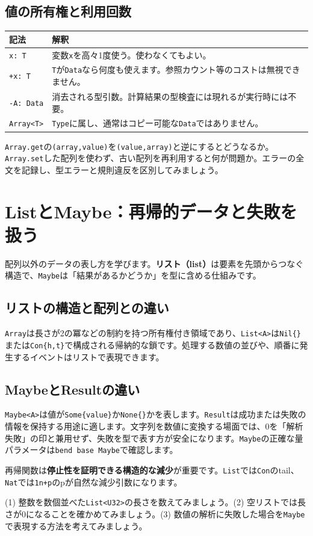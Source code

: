 \documentclass[11pt,a4paper,openany]{book}
\newcommand{\code}[1]{\texttt{#1}}
\newcommand{\term}[1]{\textbf{#1}}
\newcommand{\readcode}[2]{}
\newcommand{\exercise}[1]{\begin{exercisebox}#1\end{exercisebox}}
\begin{document}
\section{値の所有権と利用回数}
\begin{tabularx}{\linewidth}{@{}p{28mm}X@{}}
\toprule
記法 & 解釈\\
\midrule
\code{x: T} & 変数\code{x}を高々1度使う。使わなくてもよい。\\
\code{+x: T} & \code{T}が\code{Data}なら何度も使えます。参照カウント等のコストは無視できません。\\
\code{-A: Data} & 消去される型引数。計算結果の型検査には現れるが実行時には不要。\\
\code{Array<T>} & \code{Type}に属し、通常はコピー可能な\code{Data}ではありません。\\
\bottomrule
\end{tabularx}
\exercise{\code{Array.get}の\code{(array,value)}を\code{(value,array)}と逆にするとどうなるか。\code{Array.set}した配列を使わず、古い配列を再利用すると何が問題か。エラーの全文を記録し、型エラーと規則違反を区別してみましょう。}


\chapter{ListとMaybe：再帰的データと失敗を扱う}
\begin{tcolorbox}[colback=blue!3,colframe=blue!16,boxrule=.35pt,arc=1mm,left=3mm,right=3mm,top=2mm,bottom=2mm]
\small 配列以外のデータの表し方を学びます。\term{リスト（list）}は要素を先頭からつなぐ構造で、\code{Maybe}は「結果があるかどうか」を型に含める仕組みです。
\end{tcolorbox}

\section{リストの構造と配列との違い}
\code{Array}は長さが2の冪などの制約を持つ所有権付き領域であり、\code{List<A>}は\code{Nil\{\}}または\code{Con\{h,t\}}で構成される帰納的な鎖です。処理する数値の並びや、順番に発生するイベントはリストで表現できます。
\readcode{14_list_basics.bend}{リストを構造再帰で処理する（14\_list\_basics.bend）}
\section{MaybeとResultの違い}
\code{Maybe<A>}は値が\code{Some\{value\}}か\code{None\{\}}かを表します。\code{Result}は成功または失敗の情報を保持する用途に適します。文字列を数値に変換する場面では、0を「解析失敗」の印と兼用せず、失敗を型で表す方が安全になります。\code{Maybe}の正確な量パラメータは\code{bend base Maybe}で確認します。
\begin{pointbox}
再帰関数は\term{停止性を証明できる構造的な減少}が重要です。\code{List}では\code{Con}のtail、\code{Nat}では\code{1n+p}のpが自然な減少引数になります。
\end{pointbox}
\exercise{(1) 整数を数個並べた\code{List<U32>}の長さを数えてみましょう。(2) 空リストでは長さが0になることを確かめてみましょう。(3) 数値の解析に失敗した場合を\code{Maybe}で表現する方法を考えてみましょう。}
\end{document}
